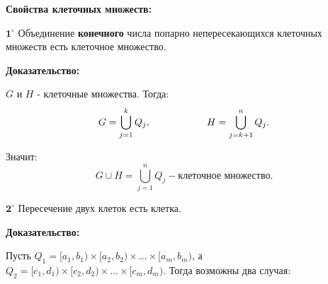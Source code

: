 \documentclass[a4paper,12pt]{article} %
\begin{document}
\begin{figure}[h!]
\begin{minipage}[h]{0.5\linewidth}
	\end{minipage}
\end{figure}

\textbf{Свойства клеточных множеств:}

$\textbf{1}^\circ$ Объединение \textbf{конечного} числа попарно непересекающихся клеточных множеств есть клеточное множество.

\textbf{Доказательство:}

$G$ и $H$ - клеточные множества. Тогда:
\begin{equation*}
	G = \bigcup_{j = 1}^k Q_j, \hspace{20mm} H = \bigcup_{j = k + 1}^n Q_j.
\end{equation*}

Значит:
\begin{equation*}
	G \cup H = \bigcup_{j = 1}^n Q_j - \text{клеточное множество}.
\end{equation*}

$\textbf{2}^\circ$ Пересечение двух клеток есть клетка.

\textbf{Доказательство:} 

Пусть $Q_1 = [a_1, b_1) \times [a_2, b_2) \times \dots \times [a_m, b_m)$, а $Q_2 = [c_1, d_1) \times [c_2, d_2) \times \dots \times [c_m, d_m)$. Тогда возможны два случая:
\end{document}
